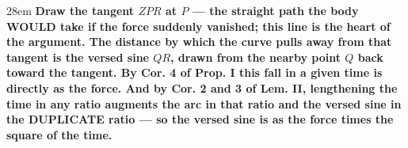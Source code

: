 \documentclass[border=4pt]{standalone}
\begin{document}
\begin{varwidth}{28em}
\large\bfseries
Draw the \textcolor{tangreen}{tangent $ZPR$ at $P$ — the straight path the body WOULD take if the force suddenly      vanished}; this line is the heart of the argument. The distance by which the curve pulls away from that      tangent is the versed sine $QR$, drawn from the nearby point $Q$ back toward the tangent. By Cor. 4 of      Prop. I this fall in a given time is directly as the force. And by Cor. 2 and 3 of Lem. II, lengthening the      time in any ratio augments the arc in that ratio and the versed sine in the DUPLICATE ratio — so the versed      sine is as the force times the square of the time.
\end{varwidth}
\end{document}
